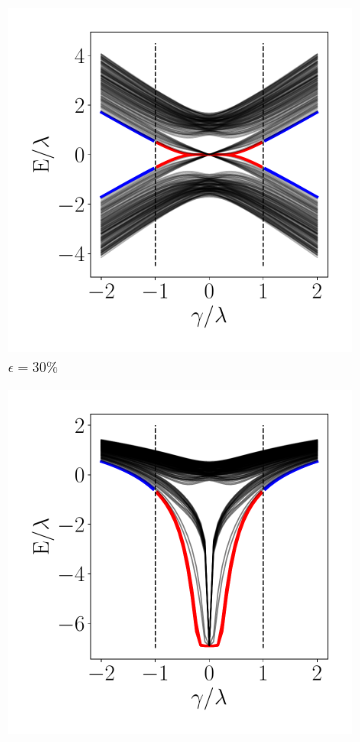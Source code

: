 \begin{figure}[h!]
     \begin{minipage}[h!]{0.9\textwidth}
         \begin{subfigure}[b!]{0.3 \textwidth}
            \caption{$\epsilon = 30\%$}             \includegraphics[width=\textwidth]{Imagenes/Resultados_Hoti_Fractal/bands_square_shh_0.3.pdf}
         \end{subfigure}\hspace*{-0.5em}
         \begin{subfigure}[b!]{0.3 \textwidth}
            \caption*{}
            \includegraphics[width=\textwidth]{Imagenes/Resultados_Hoti_Fractal/bands_square_shh_log0.3.pdf}

\end{subfigure}
\end{minipage}
\end{figure}
